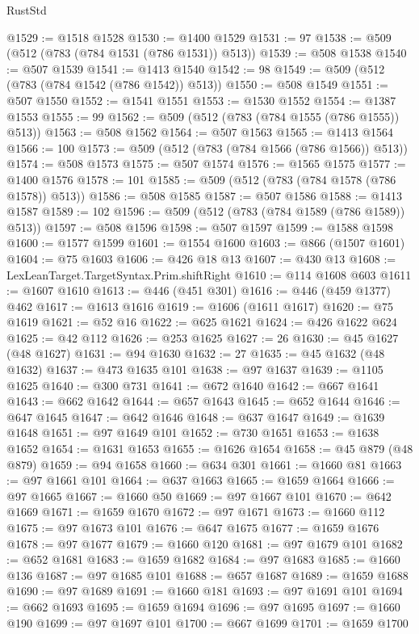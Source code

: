 \begin{lexlean}{RustStd}
\begin{coremodule}
@1529 := @1518 @1528
@1530 := @1400 @1529
@1531 := 97
@1538 := @509 (@512 (@783 (@784 @1531 (@786 @1531)) @513))
@1539 := @508 @1538
@1540 := @507 @1539
@1541 := @1413 @1540
@1542 := 98
@1549 := @509 (@512 (@783 (@784 @1542 (@786 @1542)) @513))
@1550 := @508 @1549
@1551 := @507 @1550
@1552 := @1541 @1551
@1553 := @1530 @1552
@1554 := @1387 @1553
@1555 := 99
@1562 := @509 (@512 (@783 (@784 @1555 (@786 @1555)) @513))
@1563 := @508 @1562
@1564 := @507 @1563
@1565 := @1413 @1564
@1566 := 100
@1573 := @509 (@512 (@783 (@784 @1566 (@786 @1566)) @513))
@1574 := @508 @1573
@1575 := @507 @1574
@1576 := @1565 @1575
@1577 := @1400 @1576
@1578 := 101
@1585 := @509 (@512 (@783 (@784 @1578 (@786 @1578)) @513))
@1586 := @508 @1585
@1587 := @507 @1586
@1588 := @1413 @1587
@1589 := 102
@1596 := @509 (@512 (@783 (@784 @1589 (@786 @1589)) @513))
@1597 := @508 @1596
@1598 := @507 @1597
@1599 := @1588 @1598
@1600 := @1577 @1599
@1601 := @1554 @1600
@1603 := @866 (@1507 @1601)
@1604 := @75 @1603
@1606 := @426 @18 @13
@1607 := @430 @13
@1608 := LexLeanTarget.TargetSyntax.Prim.shiftRight
@1610 := @114 @1608 @603
@1611 := @1607 @1610
@1613 := @446 (@451 @301)
@1616 := @446 (@459 @1377) @462
@1617 := @1613 @1616
@1619 := @1606 (@1611 @1617)
@1620 := @75 @1619
@1621 := @52 @16
@1622 := @625 @1621
@1624 := @426 @1622 @624
@1625 := @42 @112
@1626 := @253 @1625
@1627 := 26
@1630 := @45 @1627 (@48 @1627)
@1631 := @94 @1630
@1632 := 27
@1635 := @45 @1632 (@48 @1632)
@1637 := @473 @1635 @101
@1638 := @97 @1637
@1639 := @1105 @1625
@1640 := @300 @731
@1641 := @672 @1640
@1642 := @667 @1641
@1643 := @662 @1642
@1644 := @657 @1643
@1645 := @652 @1644
@1646 := @647 @1645
@1647 := @642 @1646
@1648 := @637 @1647
@1649 := @1639 @1648
@1651 := @97 @1649 @101
@1652 := @730 @1651
@1653 := @1638 @1652
@1654 := @1631 @1653
@1655 := @1626 @1654
@1658 := @45 @879 (@48 @879)
@1659 := @94 @1658
@1660 := @634 @301
@1661 := @1660 @81
@1663 := @97 @1661 @101
@1664 := @637 @1663
@1665 := @1659 @1664
@1666 := @97 @1665
@1667 := @1660 @50
@1669 := @97 @1667 @101
@1670 := @642 @1669
@1671 := @1659 @1670
@1672 := @97 @1671
@1673 := @1660 @112
@1675 := @97 @1673 @101
@1676 := @647 @1675
@1677 := @1659 @1676
@1678 := @97 @1677
@1679 := @1660 @120
@1681 := @97 @1679 @101
@1682 := @652 @1681
@1683 := @1659 @1682
@1684 := @97 @1683
@1685 := @1660 @136
@1687 := @97 @1685 @101
@1688 := @657 @1687
@1689 := @1659 @1688
@1690 := @97 @1689
@1691 := @1660 @181
@1693 := @97 @1691 @101
@1694 := @662 @1693
@1695 := @1659 @1694
@1696 := @97 @1695
@1697 := @1660 @190
@1699 := @97 @1697 @101
@1700 := @667 @1699
@1701 := @1659 @1700

\end{coremodule}
\end{lexlean}
